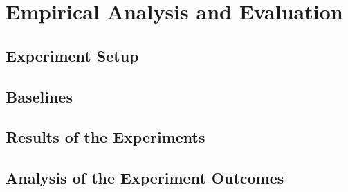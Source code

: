 %
\chapter{Empirical Analysis and Evaluation}
\label{sec:evaluation}

\Blindtext

\section{Experiment Setup}
\label{sec:evaluation:setup}

\Blindtext

\section{Baselines}
\label{sec:evaluation:baselines}

\Blindtext

\section{Results of the Experiments}
\label{sec:evaluation:results}

\Blindtext

\section{Analysis of the Experiment Outcomes}
\label{sec:evaluation:analysis}

\Blindtext
